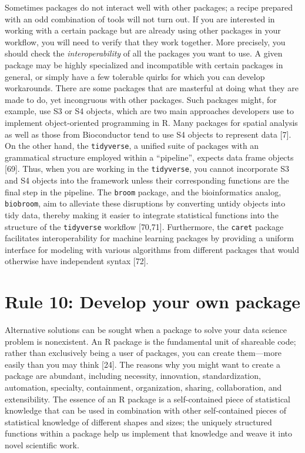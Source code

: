 \documentclass[10pt,letterpaper]{article}
\begin{document}
Sometimes packages do not interact well with other packages; a recipe
prepared with an odd combination of tools will not turn out. If you are
interested in working with a certain package but are already using other
packages in your workflow, you will need to verify that they work
together. More precisely, you should check the \emph{interoperability}
of all the packages you want to use. A given package may be highly
specialized and incompatible with certain packages in general, or simply
have a few tolerable quirks for which you can develop workarounds. There
are some packages that are masterful at doing what they are made to do,
yet incongruous with other packages. Such packages might, for example,
use S3 or S4 objects, which are two main approaches developers use to
implement object-oriented programming in R. Many packages for spatial
analysis as well as those from Bioconductor tend to use S4 objects to
represent data {[}7{]}. On the other hand, the \texttt{tidyverse}, a
unified suite of packages with an grammatical structure employed within
a ``pipeline'', expects data frame objects {[}69{]}. Thus, when you are
working in the \texttt{tidyverse}, you cannot incorporate S3 and S4
objects into the framework unless their corresponding functions are the
final step in the pipeline. The \texttt{broom} package, and the
bioinformatics analog, \texttt{biobroom}, aim to alleviate these
disruptions by converting untidy objects into tidy data, thereby making
it easier to integrate statistical functions into the structure of the
\texttt{tidyverse} workflow {[}70,71{]}. Furthermore, the \texttt{caret}
package facilitates interoperability for machine learning packages by
providing a uniform interface for modeling with various algorithms from
different packages that would otherwise have independent syntax
{[}72{]}.

\hypertarget{rule-10-develop-your-own-package}{%
\section{Rule 10: Develop your own
package}\label{rule-10-develop-your-own-package}}

Alternative solutions can be sought when a package to solve your data
science problem is nonexistent. An R package is the fundamental unit of
shareable code; rather than exclusively being a user of packages, you
can create them---more easily than you may think {[}24{]}. The reasons
why you might want to create a package are abundant, including
necessity, innovation, standardization, automation, specialty,
containment, organization, sharing, collaboration, and extensibility.
The essence of an R package is a self-contained piece of statistical
knowledge that can be used in combination with other self-contained
pieces of statistical knowledge of different shapes and sizes; the
uniquely structured functions within a package help us implement that
knowledge and weave it into novel scientific work.
\end{document}
